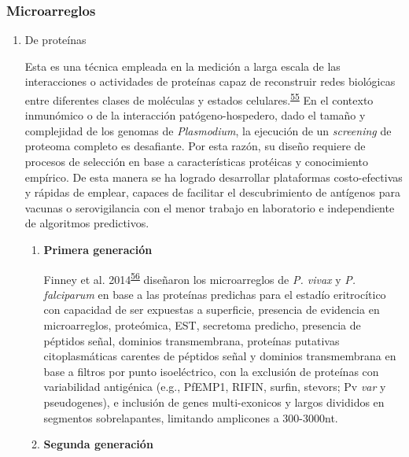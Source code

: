 \documentclass[]{article}
\begin{document}
\subsubsection{Microarreglos}\label{microarreglos}

\begin{enumerate}
\def\labelenumi{\alph{enumi}.}
\item
  De proteínas

  Esta es una técnica empleada en la medición a larga escala de las
  interacciones o actividades de proteínas capaz de reconstruir redes
  biológicas entre diferentes clases de moléculas y estados
  celulares.\textsuperscript{\protect\hyperlink{ref-uzoma2013interactome}{55}}
  En el contexto inmunómico o de la interacción patógeno-hospedero, dado
  el tamaño y complejidad de los genomas de \emph{Plasmodium}, la
  ejecución de un \emph{screening} de proteoma completo es desafiante.
  Por esta razón, su diseño requiere de procesos de selección en base a
  características protéicas y conocimiento empírico. De esta manera se
  ha logrado desarrollar plataformas costo-efectivas y rápidas de
  emplear, capaces de facilitar el descubrimiento de antígenos para
  vacunas o serovigilancia con el menor trabajo en laboratorio e
  independiente de algoritmos predictivos.

  \begin{enumerate}
  \def\labelenumii{\roman{enumii}.}
  \item
    \textbf{Primera generación}

    Finney et al.
    2014\textsuperscript{\protect\hyperlink{ref-Finney2014}{56}}
    diseñaron los microarreglos de \emph{P. vivax} y \emph{P.
    falciparum} en base a las proteínas predichas para el estadío
    eritrocítico con capacidad de ser expuestas a superficie, presencia
    de evidencia en microarreglos, proteómica, EST, secretoma predicho,
    presencia de péptidos señal, dominios transmembrana, proteínas
    putativas citoplasmáticas carentes de péptidos señal y dominios
    transmembrana en base a filtros por punto isoeléctrico, con la
    exclusión de proteínas con variabilidad antigénica (e.g., PfEMP1,
    RIFIN, surfin, stevors; Pv \emph{var} y pseudogenes), e inclusión de
    genes multi-exonicos y largos divididos en segmentos sobrelapantes,
    limitando amplicones a 300-3000nt.
  \item
    \textbf{Segunda generación}


\end{enumerate}
\end{enumerate}
\end{document}
